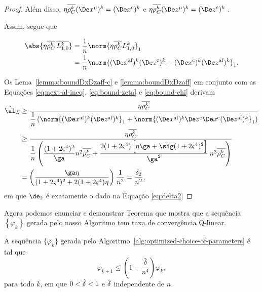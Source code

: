 \begin{proof}
Além disso,  $\eta\rhoCkb (\Dex^\mu)^{k} = \Dekcox $  e $  \eta\rhoCkb (\Dez^\mu)^{k} = \Dekcoz$ .


Assim,  segue que

	\begin{align}
	\abs{\eta\rhoCkb \,  \dbvec{L_{1,0}^{k}}} & = \dfrac{1}{n}\norm{\eta\rhoCkb L_{1,0}^{k}}_{1}  \notag \\
	& =  \dfrac{1}{n} \norm{ \dekx \Dekcoz + \Dekcox \dekz }_1.\label{eq:bound-chi}
	\end{align}


Os Lema~\ref{lemma:boundDxDzaff-c} e  \ref{lemma:boundDxDzaff} em conjunto com  as Equações \eqref{eq:next-al-ineq}, \eqref{eq:bound-zeta} e \eqref{eq:bound-chi} derivam 
\[
\begin{aligned}
\nextal_L  & \geq \frac{\eta\rhoCkb  } {\dfrac{1}{n} \left(\norm{ \dekx  \dekz }_1 +  \norm{ \dekx \Decoz  \Decox \dekz }_1 \right) } \\
		   & \geq \dfrac{\eta\rhoCkb  } {\dfrac{1}{n} \left(\dfrac{(1 + 2\bdxzstar^{4})^{2} }{\ga} n^{2}\rhoCkb + \dfrac{2(1+2\bdxzstar^{4})\left[\eta\ga + \nextsig(1+2\bdxzstar^{4})^{2}\right]}{\ga^{2}}\: n^{3}\rhoCkb  \right) } \\
		   & = \left( \dfrac{\ga\eta } {(1 + 2\bdxzstar^{4})^{2}  + 2(1+2\bdxzstar^{4})\eta}\right) \dfrac{1}{n^{2}} = \frac{\delta_{2}}{n^{2}}, 
\end{aligned}
\]
em que $\de_{2}$ é exatamente o dado na Equação \eqref{eq:delta2}
\end{proof}
 
Agora podemos enunciar e demonstrar  Teorema que mostra que a sequência $\left\{ \varphi_{k}\right\}$ gerada pelo nosso Algoritmo tem taxa de convergência Q-linear. 

\begin{teo}\label{lemma:next-phi-delta-n4}
A sequência $\{\varphi_{k}\}$ gerada pelo Algoritmo~\ref{alg:optimized-choice-of-parameters} é tal que
\begin{equation}
		\label{eq:varphi-delta-n4}
				\varphi_{k+1}\leq \left(1 - \frac{\hat{\delta}}{n^{4}}\right)\varphi_{k},
	\end{equation}
	para todo $k$, em que $0<\hat{\delta}<1$ e $\hat{\delta}$ independente de $n$.
\end{teo}


